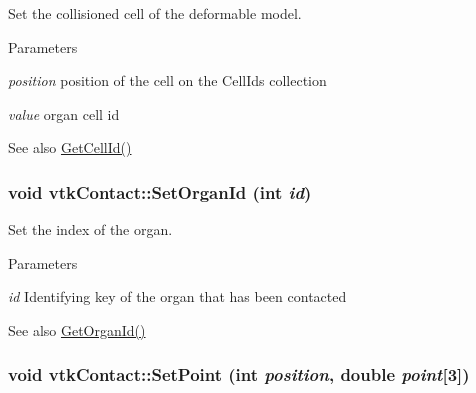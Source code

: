 Set the collisioned cell of the deformable model. 
\begin{DoxyParams}{Parameters}
\item[{\em position}]position of the cell on the CellIds collection \item[{\em value}]organ cell id \end{DoxyParams}
\begin{DoxySeeAlso}{See also}
\hyperlink{classvtkContact_a825566e780e4fca5dc766b3c7c259366}{GetCellId()} 
\end{DoxySeeAlso}
\hypertarget{classvtkContact_aeb38ed699e47ceb31df529db0ea8458f}{
\subsubsection[{SetOrganId}]{\setlength{\rightskip}{0pt plus 5cm}void vtkContact::SetOrganId (int {\em id})}}
\label{classvtkContact_aeb38ed699e47ceb31df529db0ea8458f}


Set the index of the organ. 
\begin{DoxyParams}{Parameters}
\item[{\em id}]Identifying key of the organ that has been contacted \end{DoxyParams}
\begin{DoxySeeAlso}{See also}
\hyperlink{classvtkContact_a44064eb7f79795b0c685deb2ecca7ecc}{GetOrganId()} 
\end{DoxySeeAlso}
\hypertarget{classvtkContact_a182b4b0d7769a3fde4a8236c4b462b85}{
\subsubsection[{SetPoint}]{\setlength{\rightskip}{0pt plus 5cm}void vtkContact::SetPoint (int {\em position}, \/  double {\em point}\mbox{[}3\mbox{]})}}
\label{classvtkContact_a182b4b0d7769a3fde4a8236c4b462b85}


